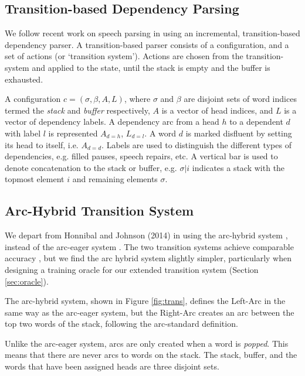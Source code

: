 \documentclass[11pt,letterpaper]{article}
\begin{document}
\subsection{Transition-based Dependency Parsing}

We follow recent work on speech parsing in using an incremental, transition-based
dependency parser.
A transition-based parser \citep{nivre:08} consists of a configuration,
and a set of actions (or `transition system').  Actions are chosen from the
transition-system and applied to the state, until the stack is empty and the
buffer is exhausted.

A configuration $c = (\sigma, \beta, A, L)$,
where $\sigma$ and $\beta$ are disjoint sets of word
indices termed the \emph{stack} and \emph{buffer} respectively, $A$ is a
vector of head indices, and $L$ is a vector of dependency labels.  A dependency
arc from a head $h$ to a dependent $d$ with label $l$ is represented $A_{d=h}$,
$L_{d=l}$.  A word $d$ is marked disfluent by setting its head to itself, i.e.
$A_{d=d}$.  Labels are used to distinguish the different types of dependencies,
e.g. filled pauses, speech repairs, etc.
A vertical bar is used to denote concatenation
to the stack or buffer, e.g. $\sigma | i$ indicates a stack with the topmost
element $i$ and remaining elements $\sigma$.

\subsection{Arc-Hybrid Transition System}

We depart from Honnibal and Johnson (2014) in using the arc-hybrid system \citep{kuhlmann:11},
instead of the arc-eager system \citep{nivre:03}. The two transition systems achieve
comparable accuracy \citep{goldberg:13}, but we find the arc hybrid system slightly
simpler, particularly when designing a training oracle for our extended transition
system (Section \ref{sec:oracle}).

The arc-hybrid system, shown in Figure \ref{fig:trans}, defines the Left-Arc in
the same way as the \citet{nivre:03}
arc-eager system, but the Right-Arc creates an arc between the top two words of
the stack, following the arc-standard definition.

Unlike the arc-eager system,
arcs are only created when a word is \emph{popped}.
This means that there are never arcs to words on the stack.
The stack, buffer, and the words that have been assigned heads are three disjoint
sets.
\end{document}
